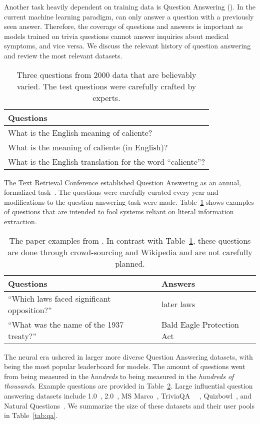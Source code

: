 Another task heavily dependent on training data is Question Answering ().  
%
In the current machine learning paradigm,  can only answer a question with a previously seen answer.  
%
Therefore, the coverage of questions and answers is important as
models trained on trivia questions cannot answer inquiries about medical symptoms, and vice versa.
%
We discuss the relevant history of question answering and review the most relevant datasets.  

\begin{table}
	\centering{}
	\begin{tabular}{l}
		\textbf{Questions} \\
		\hline
		What is the English meaning of caliente? \\
		What is the meaning of caliente (in English)? \\
		What is the English translation for the word ``caliente''? \\
	\end{tabular}
	\caption{Three questions from \trec{} 2000 data that are believably varied.  The test questions were carefully crafted by experts.}
	\label{tab:trec}
\end{table}
The Text Retrieval Conference established Question Answering as an annual, formalized task~\citep{voorhees1999trec}.  
%
The questions were carefully curated every year and modifications to the question answering task were made. 
%
Table~\ref{tab:trec} shows examples of questions that are intended to fool systems reliant on literal information extraction.  


\begin{table}
	\centering{}
	\begin{tabular}{l l}
		\textbf{Questions} &	\textbf{Answers}\\
		\hline
		``Which laws faced significant opposition?'' & later laws \\
		``What was the name of the 1937 treaty?'' & Bald Eagle Protection Act \\
	\end{tabular}
	\caption{The paper examples from \squad{}.  In contrast with Table~\ref{tab:trec}, these questions are done through crowd-sourcing and Wikipedia and are not carefully planned. }
	\label{tab:squad}
\end{table}

The neural era ushered in larger more diverse Question Answering datasets, with \squad{} \citep{rajpurkar-16, rajpurkar-18} being the most popular leaderboard for models.  
%
The amount of questions went from being measured in the \textit{hundreds }to being measured in the \textit{hundreds of thousands}.  
%
Example questions are provided in Table~\ref{tab:squad}.
%
Large influential question answering datasets include \squad{} 1.0~\citep{rajpurkar-16}, \squad{} 2.0~\citep{rajpurkar-18}, MS Marco~\citep{bajaj2016ms}, TriviaQA~\citep{joshi2017triviaqa} \quac{}~\citep{choi2018quac}, Quizbowl~\citep{rodriguez2019quizbowl}, and Natural Questions~\citep{kwiatkowski2019natural}. 
%
We summarize the size of these datasets and their user pools in Table~\ref{tab:qa}.


